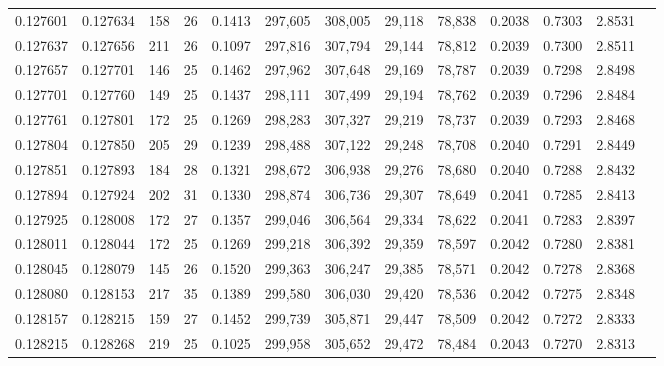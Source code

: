 \begin{tabular}{rrrrrrrrrrrrr}
0.127601 & 0.127634 & 158 &  26 &                                     0.1413 & 297,605 & 308,005 &  29,118 &  78,838 & 0.2038 & 0.7303 & 2.8531 \\
0.127637 & 0.127656 & 211 &  26 &                                     0.1097 & 297,816 & 307,794 &  29,144 &  78,812 & 0.2039 & 0.7300 & 2.8511 \\
0.127657 & 0.127701 & 146 &  25 &                                     0.1462 & 297,962 & 307,648 &  29,169 &  78,787 & 0.2039 & 0.7298 & 2.8498 \\
0.127701 & 0.127760 & 149 &  25 &                                     0.1437 & 298,111 & 307,499 &  29,194 &  78,762 & 0.2039 & 0.7296 & 2.8484 \\
0.127761 & 0.127801 & 172 &  25 &                                     0.1269 & 298,283 & 307,327 &  29,219 &  78,737 & 0.2039 & 0.7293 & 2.8468 \\
0.127804 & 0.127850 & 205 &  29 &                                     0.1239 & 298,488 & 307,122 &  29,248 &  78,708 & 0.2040 & 0.7291 & 2.8449 \\
0.127851 & 0.127893 & 184 &  28 &                                     0.1321 & 298,672 & 306,938 &  29,276 &  78,680 & 0.2040 & 0.7288 & 2.8432 \\
0.127894 & 0.127924 & 202 &  31 &                                     0.1330 & 298,874 & 306,736 &  29,307 &  78,649 & 0.2041 & 0.7285 & 2.8413 \\
0.127925 & 0.128008 & 172 &  27 &                                     0.1357 & 299,046 & 306,564 &  29,334 &  78,622 & 0.2041 & 0.7283 & 2.8397 \\
0.128011 & 0.128044 & 172 &  25 &                                     0.1269 & 299,218 & 306,392 &  29,359 &  78,597 & 0.2042 & 0.7280 & 2.8381 \\
0.128045 & 0.128079 & 145 &  26 &                                     0.1520 & 299,363 & 306,247 &  29,385 &  78,571 & 0.2042 & 0.7278 & 2.8368 \\
0.128080 & 0.128153 & 217 &  35 &                                     0.1389 & 299,580 & 306,030 &  29,420 &  78,536 & 0.2042 & 0.7275 & 2.8348 \\
0.128157 & 0.128215 & 159 &  27 &                                     0.1452 & 299,739 & 305,871 &  29,447 &  78,509 & 0.2042 & 0.7272 & 2.8333 \\
0.128215 & 0.128268 & 219 &  25 &                                     0.1025 & 299,958 & 305,652 &  29,472 &  78,484 & 0.2043 & 0.7270 & 2.8313 \\

\end{tabular}
